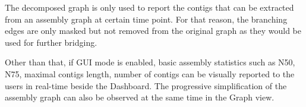 \documentclass[10pt,twocolumn,twoside]{genpaper}
\begin{document}
The decomposed graph is only used to report the contigs that can be extracted from an assembly graph at certain time point. For that reason, the branching edges are only masked but not removed from the original graph as they would be used for further bridging.

Other than that, if GUI mode is enabled, basic assembly statistics such as N50, N75, maximal contigs length, number of contigs can be visually reported to the users in real-time beside the Dashboard. The progressive simplification of the assembly graph can also be observed at the same time in the Graph view.


 
\end{document}
